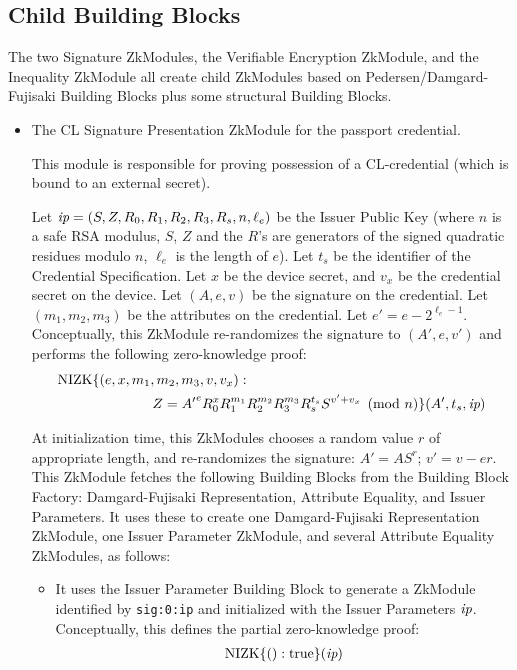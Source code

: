 \iffalse
\subsection{Child Building Blocks}
The two Signature ZkModules, the Verifiable Encryption ZkModule, and the Inequality ZkModule all create child ZkModules
based on Pedersen/Damgard-Fujisaki Building Blocks plus some structural Building Blocks.

\begin{itemize}
\item The CL Signature Presentation ZkModule for the passport credential.

This module is responsible for proving possession of a CL-credential (which is
bound to an external secret).

Let $\emph{ip} = (S, Z, R_0, R_1, R_2, R_3, R_s, n, \ell_e)$ be the Issuer Public Key
(where $n$ is a safe RSA modulus, $S$, $Z$ and the $R$'s are generators of the
signed quadratic residues modulo $n$, $\ell_e$ is the length of $e$). Let $t_s$ be the
identifier of the Credential Specification.
Let $x$ be the device secret, and $v_x$ be the credential secret on the device.
Let $(A, e, v)$ be the signature on the credential. Let
$(m_1, m_2, m_3)$ be the attributes on the credential. Let $e' = e - 2^{\ell_e-1}$.
Conceptually, this ZkModule re-randomizes the signature to $(A', e, v')$
and performs the following zero-knowledge proof:
\begin{align}
\label{eq:ex:cl:full}
\operatorname{NIZK}\lbrace(e, x, m_1, m_2, m_3, v, v_x):& \nonumber\\
Z = {A'}^e R_0^{x} R_1^{m_1}& R_2^{m_2} R_3^{m_3} R_s^{t_s} S^{v' + v_x} \pmod{n}
\rbrace(A', t_s, \emph{ip})
\end{align}

At initialization time, this ZkModules chooses a random value $r$ of appropriate
length, and re-randomizes the signature:
$A' = AS^r$; $v' = v - er$.
This ZkModule fetches the following Building Blocks from the Building Block Factory:
Damgard-Fujisaki Representation, Attribute Equality, and Issuer Parameters.
It uses these to create one Damgard-Fujisaki Representation ZkModule,
one Issuer Parameter ZkModule, and several
Attribute Equality ZkModules, as follows:

\begin{itemize}
\item It uses the Issuer Parameter Building Block to generate a ZkModule identified
by \texttt{sig:0:ip} and initialized with the Issuer Parameters $\emph{ip}$.
Conceptually, this defines the partial zero-knowledge proof:
\begin{align}
\label{eq:ex:cl:first}
\operatorname{NIZK}\lbrace(): \operatorname{true}\rbrace(\emph{ip})
\end{align}


\end{itemize}
\end{itemize}

